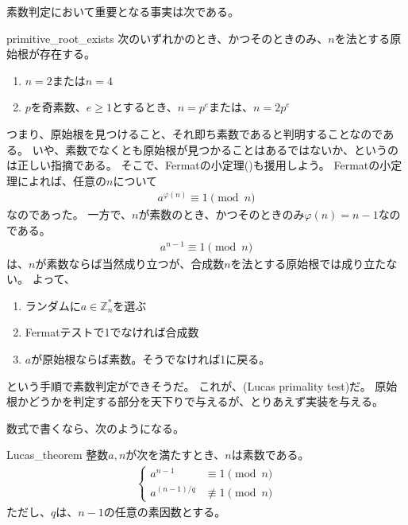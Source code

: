 素数判定において重要となる事実は次である。

\begin{Prop}{}{primitive_root_exists}
次のいずれかのとき、かつそのときのみ、$n$を法とする原始根が存在する。
\begin{enumerate}
 \item $n=2$または$n=4$
 \item $p$を奇素数、$e\ge1$とするとき、$n=p^e$または、$n=2p^e$
\end{enumerate}
\end{Prop}

つまり、原始根を見つけること、それ即ち素数であると判明することなのである。
いや、素数でなくとも原始根が見つかることはあるではないか、というのは正しい指摘である。
そこで、Fermatの小定理()も援用しよう。
Fermatの小定理によれば、任意の$n$について
\begin{align*}
a^{\varphi(n)} \equiv 1 \pmod{n}
\end{align*}
なのであった。
一方で、$n$が素数のとき、かつそのときのみ$\varphi(n)=n-1$なのである。
\begin{align*}
a^{n-1} \equiv 1 \pmod{n}
\end{align*}
は、$n$が素数ならば当然成り立つが、合成数$n$を法とする原始根では成り立たない。
よって、
\begin{enumerate}
 \item ランダムに$a\in\mathbb{Z}_n^*$を選ぶ
 \item Fermatテストで1でなければ合成数
 \item $a$が原始根ならば素数。そうでなければ1に戻る。
\end{enumerate}
という手順で素数判定ができそうだ。
これが、(Lucas primality test)だ。
原始根かどうかを判定する部分を天下りで与えるが、とりあえず実装を与える。


数式で書くなら、次のようになる。

\begin{Theo}{}{Lucas_theorem}
整数$a,n$が次を満たすとき、$n$は素数である。
\begin{align*}
\begin{cases}
a^{n-1} &\equiv 1 \pmod{n}\\
a^{(n-1)/q} &\not\equiv 1 \pmod{n}
\end{cases}
\end{align*}
ただし、$q$は、$n-1$の任意の素因数とする。
\end{Theo}

